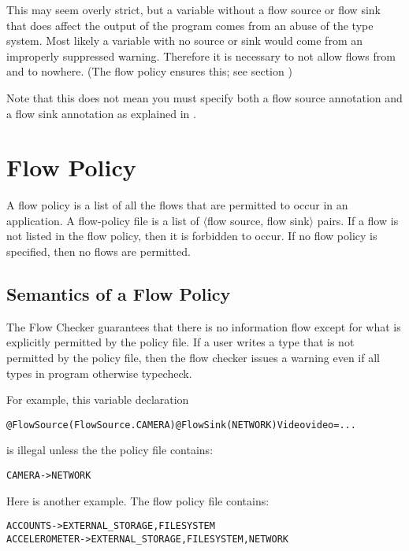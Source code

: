 This may seem overly strict, but a variable without a flow source or
flow sink that does affect the output of the program comes from an
abuse of the type system.  Most likely a variable with no source or
sink would come from an improperly suppressed warning. Therefore it is
necessary to not allow flows from and to nowhere.  (The flow policy
ensures this; see section )

Note that this does not mean you must specify both a flow source
annotation and a flow sink annotation as explained in
. 

 


\section{Flow Policy\label{sec:flow-policy}}

A flow policy is a list of all the flows that are permitted to occur in an application.
A flow-policy file is a list 
 of $\langle$flow source, flow sink$\rangle$ pairs.  If a flow is not listed in the flow policy, then 
 it is forbidden to occur.  If no flow policy is specified, then no flows are permitted. 
 
\subsection{Semantics of a Flow Policy}
\label{sec:undsiredflows}
The Flow Checker guarantees that there is no information
flow except for what is explicitly permitted by the policy file. If a user writes a type that is
not permitted by the policy file, then the flow checker issues a warning
even if all types in program otherwise typecheck.

For example, this variable declaration

\begin{alltt}
@FlowSource(FlowSource.CAMERA) @FlowSink(NETWORK) Video video = ...
\end{alltt}

\noindent
is illegal unless the the policy file contains:

\begin{alltt}
CAMERA -> NETWORK
\end{alltt}

Here is another example.
The flow policy file contains:
\begin{alltt}
  ACCOUNTS      -> EXTERNAL_STORAGE, FILESYSTEM
  ACCELEROMETER -> EXTERNAL_STORAGE, FILESYSTEM, NETWORK
\end{alltt}

